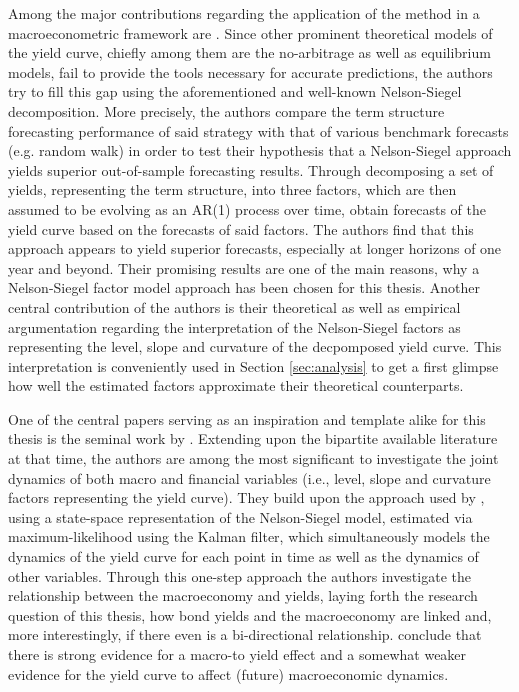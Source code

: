 Among the major contributions regarding the application of the \citet{nelson1987parsimonious} method in a macroeconometric framework are \citet{diebold2006forecasting}. Since other prominent theoretical models of the yield curve, chiefly among them are the no-arbitrage as well as equilibrium models, fail to provide the tools necessary for accurate predictions, the authors try to fill this gap using the aforementioned and well-known Nelson-Siegel decomposition.
More precisely, the authors compare the term structure forecasting performance of said  strategy with that of various benchmark forecasts (e.g. random walk) in order to test their hypothesis that a Nelson-Siegel approach yields superior out-of-sample forecasting results.
Through decomposing a set of yields, representing the term structure, into three factors, which are then assumed to be evolving as an AR(1) process over time, \citet{diebold2006forecasting} obtain forecasts of the yield curve based on the forecasts of said factors.
The authors find that this approach appears to yield superior forecasts, especially at longer horizons of one year and beyond.
Their promising results are one of the main reasons, why a Nelson-Siegel factor model approach has been chosen for this thesis.
Another central contribution of the authors is their theoretical as well as empirical argumentation regarding the interpretation of the Nelson-Siegel factors as representing the level, slope and curvature of the decpomposed yield curve. This interpretation is conveniently used in Section \ref{sec:analysis} to get a first glimpse how well the estimated factors approximate their theoretical counterparts. 

One of the central papers serving as an inspiration and template alike for this thesis is the seminal work by \citet{diebold2006macroeconomy}. 
Extending upon the bipartite available literature at that time, the authors are among the most significant to investigate the joint dynamics of both macro and financial variables (i.e., level, slope and curvature factors representing the yield curve). 
They build upon the approach used by \citet{diebold2006forecasting}, using a state-space representation of the Nelson-Siegel model, estimated via maximum-likelihood using the Kalman filter, which simultaneously models the dynamics of the yield curve for each point in time as well as the dynamics of other variables. Through this one-step approach the authors investigate the relationship between the macroeconomy and yields, laying forth the research question of this thesis, how bond yields and the macroeconomy are linked and, more interestingly, if there even is a bi-directional relationship. 
\citet{diebold2006macroeconomy} conclude that there is strong evidence for a macro-to yield effect and a somewhat weaker evidence for the yield curve to affect (future) macroeconomic dynamics. 

